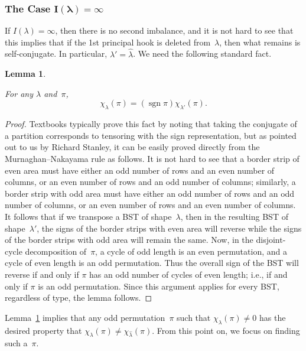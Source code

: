 \documentclass[12pt]{article}
\DeclareMathOperator{\sgn}{sgn}
\newtheorem{lemma}{Lemma}
\theoremstyle{definition}
\begin{document}
\subsubsection{The Case
\texorpdfstring{$\bm{I(\lambda)=\infty}$}{Iinfty}}
\label{subsec:Iinfty}


If $I(\lambda)=\infty$, then there is no second imbalance,
and it is not hard to see that this implies that
if the 1st principal hook is deleted from~$\lambda$,
then what remains is self-conjugate.
In particular, $\lambda' = \hat \lambda$.
We need the following standard fact.

\begin{lemma}
\label{lem:tensorsign}

For any $\lambda$ and~$\pi$,
\begin{equation*}
\chi_{\lambda}(\pi) = (\sgn\pi) \chi_{\lambda'}(\pi).
\end{equation*}
\end{lemma}

\begin{proof}

Textbooks typically prove this fact by noting that taking the
conjugate of a partition corresponds to tensoring with the sign
representation, but as pointed out to us by Richard Stanley,
it can be easily proved directly from the Murnaghan--Nakayama rule
as follows.
It is not hard to see that a border strip of even area
must have either an odd number of rows and an even number of columns,
or an even number of rows and an odd number of columns;
similarly, a border strip with odd area
must have either an odd number of rows and an odd number of columns,
or an even number of rows and an even number of columns.
It follows that if we transpose a BST of shape~$\lambda$,
then in the resulting BST of shape~$\lambda'$,
the signs of the border strips with even area will reverse
while the signs of the border strips with odd area
will remain the same.
Now, in the disjoint-cycle decomposition of~$\pi$,
a cycle of odd length is an even permutation,
and a cycle of even length is an odd permutation.
Thus the overall sign of the BST will reverse
if and only if $\pi$ has an odd number of
cycles of even length; i.e.,
if and only if $\pi$ is an odd permutation.
Since this argument applies for every BST, regardless of type,
the lemma follows.
\end{proof}


Lemma~\ref{lem:tensorsign} implies that
any odd permutation~$\pi$
such that $\chi_\lambda(\pi) \ne 0$
has the desired property that
$\chi_\lambda(\pi) \ne \chi_{\hat\lambda}(\pi)$.
\relax From this point on, we focus on finding such a~$\pi$.
\end{document}
